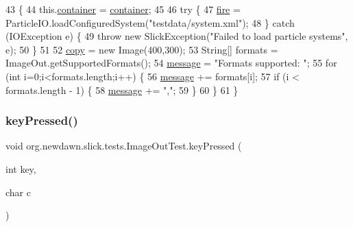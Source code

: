 \begin{DoxyCode}
43                                                                     \{
44         this.\mbox{\hyperlink{classorg_1_1newdawn_1_1slick_1_1tests_1_1_image_out_test_a09db11b63df42087043028eceef5d69a}{container}} = \mbox{\hyperlink{classorg_1_1newdawn_1_1slick_1_1tests_1_1_image_out_test_a09db11b63df42087043028eceef5d69a}{container}};
45         
46         \textcolor{keywordflow}{try} \{
47             \mbox{\hyperlink{classorg_1_1newdawn_1_1slick_1_1tests_1_1_image_out_test_a2e0a07e6c79bc05ee2dea61df862bee1}{fire}} = ParticleIO.loadConfiguredSystem(\textcolor{stringliteral}{"testdata/system.xml"});
48         \} \textcolor{keywordflow}{catch} (IOException e) \{
49             \textcolor{keywordflow}{throw} \textcolor{keyword}{new} SlickException(\textcolor{stringliteral}{"Failed to load particle systems"}, e);
50         \}
51         
52         \mbox{\hyperlink{classorg_1_1newdawn_1_1slick_1_1tests_1_1_image_out_test_ad8082ef3214a67735e03352b0407d0d8}{copy}} = \textcolor{keyword}{new} Image(400,300);
53         String[] formats = ImageOut.getSupportedFormats();
54         \mbox{\hyperlink{classorg_1_1newdawn_1_1slick_1_1tests_1_1_image_out_test_a96846c61934f6af57af5518de174d7ee}{message}} = \textcolor{stringliteral}{"Formats supported: "};
55         \textcolor{keywordflow}{for} (\textcolor{keywordtype}{int} i=0;i<formats.length;i++) \{
56             \mbox{\hyperlink{classorg_1_1newdawn_1_1slick_1_1tests_1_1_image_out_test_a96846c61934f6af57af5518de174d7ee}{message}} += formats[i];
57             \textcolor{keywordflow}{if} (i < formats.length - 1) \{
58                 \mbox{\hyperlink{classorg_1_1newdawn_1_1slick_1_1tests_1_1_image_out_test_a96846c61934f6af57af5518de174d7ee}{message}} += \textcolor{stringliteral}{","};
59             \}
60         \}
61     \}
\end{DoxyCode}
\mbox{\label{classorg_1_1newdawn_1_1slick_1_1tests_1_1_image_out_test_ae35bb720ba0ef09a785a6e58d0b86982}} 
\subsubsection{\texorpdfstring{key\+Pressed()}{keyPressed()}}
{\footnotesize\ttfamily void org.\+newdawn.\+slick.\+tests.\+Image\+Out\+Test.\+key\+Pressed (\begin{DoxyParamCaption}\item[{int}]{key,  }\item[{char}]{c }\end{DoxyParamCaption})\hspace{0.3cm}{\ttfamily [inline]}}

